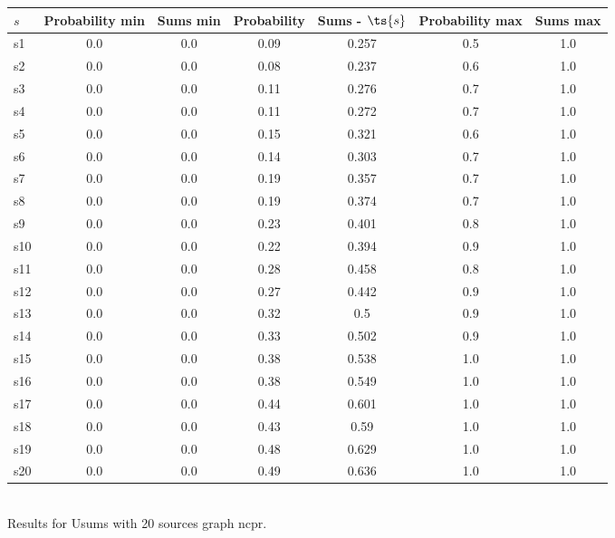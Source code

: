 \documentclass{article}
\begin{document}
\noindent\begin{tabular}{|l|c|c|c|c|c|c|}
\hline
$s$& Probability min & Sums min & Probability & Sums - $\ts{s}$ & Probability max & Sums max\\
\hline
s1 &0.0 & 0.0 & 0.09 & 0.257 & 0.5 & 1.0\\
\hline
s2 &0.0 & 0.0 & 0.08 & 0.237 & 0.6 & 1.0\\
\hline
s3 &0.0 & 0.0 & 0.11 & 0.276 & 0.7 & 1.0\\
\hline
s4 &0.0 & 0.0 & 0.11 & 0.272 & 0.7 & 1.0\\
\hline
s5 &0.0 & 0.0 & 0.15 & 0.321 & 0.6 & 1.0\\
\hline
s6 &0.0 & 0.0 & 0.14 & 0.303 & 0.7 & 1.0\\
\hline
s7 &0.0 & 0.0 & 0.19 & 0.357 & 0.7 & 1.0\\
\hline
s8 &0.0 & 0.0 & 0.19 & 0.374 & 0.7 & 1.0\\
\hline
s9 &0.0 & 0.0 & 0.23 & 0.401 & 0.8 & 1.0\\
\hline
s10 &0.0 & 0.0 & 0.22 & 0.394 & 0.9 & 1.0\\
\hline
s11 &0.0 & 0.0 & 0.28 & 0.458 & 0.8 & 1.0\\
\hline
s12 &0.0 & 0.0 & 0.27 & 0.442 & 0.9 & 1.0\\
\hline
s13 &0.0 & 0.0 & 0.32 & 0.5 & 0.9 & 1.0\\
\hline
s14 &0.0 & 0.0 & 0.33 & 0.502 & 0.9 & 1.0\\
\hline
s15 &0.0 & 0.0 & 0.38 & 0.538 & 1.0 & 1.0\\
\hline
s16 &0.0 & 0.0 & 0.38 & 0.549 & 1.0 & 1.0\\
\hline
s17 &0.0 & 0.0 & 0.44 & 0.601 & 1.0 & 1.0\\
\hline
s18 &0.0 & 0.0 & 0.43 & 0.59 & 1.0 & 1.0\\
\hline
s19 &0.0 & 0.0 & 0.48 & 0.629 & 1.0 & 1.0\\
\hline
s20 &0.0 & 0.0 & 0.49 & 0.636 & 1.0 & 1.0\\
\hline
\end{tabular}\\

\noindent Results for Usums with 20 sources graph ncpr.
\end{document}
